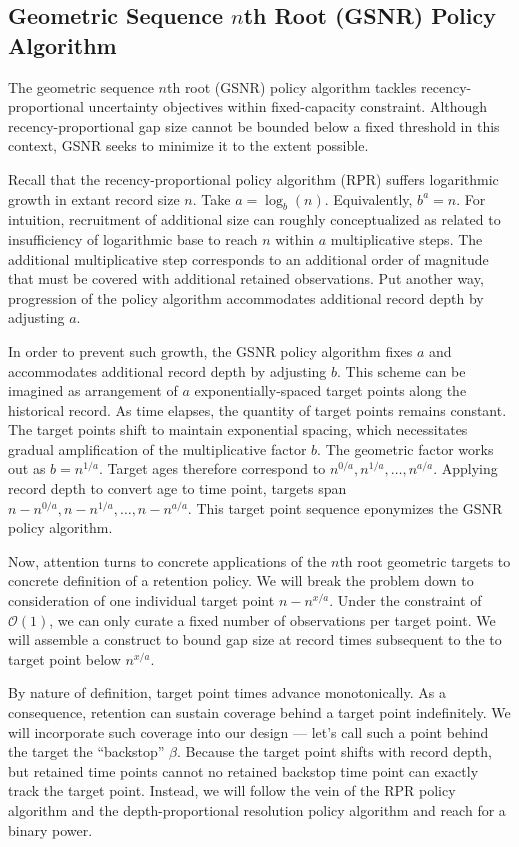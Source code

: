 \subsection{Geometric Sequence $n$th Root (GSNR) Policy Algorithm}
\label{sec:geom-seq-nth-root-algo}

The geometric sequence $n$th root (GSNR) policy algorithm tackles recency-proportional uncertainty objectives within fixed-capacity constraint.
Although recency-proportional gap size cannot be bounded below a fixed threshold in this context, GSNR seeks to minimize it to the extent possible.

Recall that the recency-proportional policy algorithm (RPR) suffers logarithmic growth in extant record size $n$.
Take $a = \log_b(n)$.
Equivalently, $b^a = n$.
For intuition, recruitment of additional size can roughly conceptualized as related to insufficiency of logarithmic base to reach $n$ within $a$ multiplicative steps.
The additional multiplicative step corresponds to an additional order of magnitude that must be covered with additional retained observations.
Put another way, progression of the policy algorithm accommodates additional record depth by adjusting $a$.

In order to prevent such growth, the GSNR policy algorithm fixes $a$ and accommodates additional record depth by adjusting $b$.
This scheme can be imagined as arrangement of $a$ exponentially-spaced target points along the historical record.
As time elapses, the quantity of target points remains constant.
The target points shift to maintain exponential spacing, which necessitates gradual amplification of the multiplicative factor $b$.
The geometric factor works out as $b = n^{1/a}$.
Target ages therefore correspond to $n^{0/a}, n^{1/a}, \ldots, n^{a/a}$.
Applying record depth to convert age to time point, targets span $n - n^{0/a}, n - n^{1/a}, \ldots, n - n^{a/a}$.
This target point sequence eponymizes the GSNR policy algorithm.

Now, attention turns to concrete applications of the $n$th root geometric targets to concrete definition of a retention policy.
We will break the problem down to consideration of one individual target point $n - n^{x/a}$.
Under the constraint of $\mathcal{O}(1)$, we can only curate a fixed number of observations per target point.
We will assemble a construct to bound gap size at record times subsequent to the to target point below $n^{x/a}$.

By nature of definition, target point times advance monotonically.
As a consequence, retention can sustain coverage behind a target point indefinitely.
We will incorporate such coverage into our design --- let's call such a point behind the target the ``backstop'' $\beta$.
Because the target point shifts with record depth, but retained time points cannot no retained backstop time point can exactly track the target point.
Instead, we will follow the vein of the RPR policy algorithm and the depth-proportional resolution policy algorithm and reach for a binary power.

